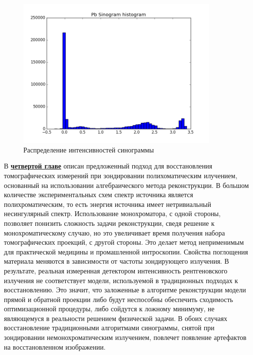 \begin{figure}
	\centering
	\includegraphics[width=0.9\textwidth]{Dissertation/images/part2_img/pb_hist}
	\caption{Распределение интенсивностей синограммы}
	\label{fig:pb_hist}
\end{figure}



\vspace{5mm}

В \underline{\textbf{четвертой главе}} описан предложенный подход для восстановления томографических измерений при зондировании полихоматическим илучением, основанный на использовании алгебраического метода реконструкции.
В большом количестве экспериментальных схем спектр источника является полихроматическим, то есть энергия источника имеет нетривиальный несингулярный спектр.
Использование монохроматора, с одной стороны, позволяет понизить сложность задачи реконструкции, сведя решение к монохроматическому случаю, но это увеличивает время получения набора томографических проекций, с другой стороны.
Это делает метод неприменимым для практической медицины и промашленной интроскопии.
Свойства поглощения материала меняются в зависимости от частоты зондирующего излучения.
В результате, реальная измеренная детектором интенсивность рентгеновского излучения не соответствует модели, используемой в традиционных подходах к восстановлению.
Это значит, что заложенные в алгоритме реконструкции модели прямой и обратной проекции либо будут неспособны обеспечить сходимость оптимизационной процедуры, либо сойдутся к ложному минимуму, не являющемуся в реальности решением физической задачи.
В обоих случаях восстановление традиционными алгоритмами синограммы, снятой при зондировании немонохроматическим излучением, повлечет появление артефактов на восстановленном изображении.

